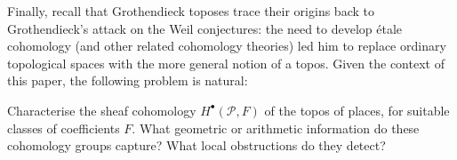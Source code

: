 \documentclass[a4paper, 11pt,reqno]{amsart}
\newcommand{\calP}{\mathcal{P}}
\begin{document}
Finally, recall that Grothendieck toposes trace their origins back to Grothendieck's attack on the Weil conjectures: the need to develop \'{e}tale cohomology (and other related cohomology theories) led him to replace ordinary topological spaces with the more general notion of a topos. Given the context of this paper, the following problem is natural:

\begin{problem} Characterise the sheaf cohomology $H^\bullet(\calP,F)$ of the topos of
	places, for suitable classes of coefficients $F$.  What geometric or arithmetic information do these cohomology groups capture? What local obstructions do they detect?
\end{problem}




\end{document}
